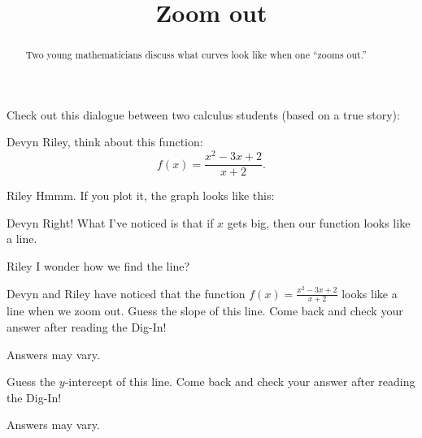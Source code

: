 \documentclass{ximera}
\title[Break-Ground:]{Zoom out}
\begin{document}
\begin{abstract}
Two young mathematicians discuss what curves look like when one
``zooms out.''
\end{abstract}
\maketitle

Check out this dialogue between two calculus students (based on a true
story):

\begin{dialogue}
\item[Devyn] Riley, think about this function:
  \[
  f(x) = \frac{x^2-3x+2}{x+2}.
  \]
\item[Riley] Hmmm. If you plot it, the graph looks like this:
  \begin{image}
  \end{image}
\item[Devyn] Right! What I've noticed is that if $x$ gets big, then
  our function looks like a line.
\item[Riley] I wonder how we find the line? 
\end{dialogue}

\begin{problem}
Devyn and Riley have noticed that the function $f(x) = \frac{x^2 - 3x
  + 2}{x+2}$ looks like a line when we zoom out.  Guess the slope of
this line.  Come back and check your answer after reading the Dig-In!
\begin{freeResponse}
Answers may vary.
\end{freeResponse}
\end{problem}

\begin{problem}
   Guess the $y$-intercept of this line.  Come back and check your
   answer after reading the Dig-In!
   \begin{freeResponse}
   Answers may vary.
   \end{freeResponse}
\end{problem}



%
\end{document}
